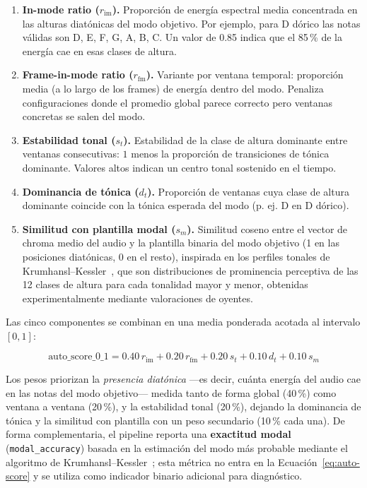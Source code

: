 \documentclass[%
    school=etsisi,%
    type=pfg,%
    degree=61CD,%
]{upm-report}
\begin{document}
\begin{enumerate}
    \item \textbf{In-mode ratio ($r_\text{im}$).} Proporci\'on de energ\'ia espectral media concentrada en las alturas diat\'onicas del modo objetivo. Por ejemplo, para D d\'orico las notas v\'alidas son D, E, F, G, A, B, C. Un valor de 0.85 indica que el 85\,\% de la energ\'ia cae en esas clases de altura.

    \item \textbf{Frame-in-mode ratio ($r_\text{fm}$).} Variante por ventana temporal: proporci\'on media (a lo largo de los frames) de energ\'ia dentro del modo. Penaliza configuraciones donde el promedio global parece correcto pero ventanas concretas se salen del modo.

    \item \textbf{Estabilidad tonal ($s_t$).} Estabilidad de la clase de altura dominante entre ventanas consecutivas: $1$ menos la proporci\'on de transiciones de t\'onica dominante. Valores altos indican un centro tonal sostenido en el tiempo.

    \item \textbf{Dominancia de t\'onica ($d_t$).} Proporci\'on de ventanas cuya clase de altura dominante coincide con la t\'onica esperada del modo (p. ej. D en D d\'orico).

    \item \textbf{Similitud con plantilla modal ($s_m$).} Similitud coseno entre el vector de chroma medio del audio y la plantilla binaria del modo objetivo (1 en las posiciones diat\'onicas, 0 en el resto), inspirada en los perfiles tonales de Krumhansl--Kessler~\cite{krumhansl1982}, que son distribuciones de prominencia perceptiva de las 12 clases de altura para cada tonalidad mayor y menor, obtenidas experimentalmente mediante valoraciones de oyentes.
\end{enumerate}

Las cinco componentes se combinan en una media ponderada acotada al intervalo $[0,1]$:

\begin{equation}
    \text{auto\_score\_0\_1} = 0.40\,r_\text{im} + 0.20\,r_\text{fm} + 0.20\,s_t + 0.10\,d_t + 0.10\,s_m
    \label{eq:auto-score}
\end{equation}

Los pesos priorizan la \emph{presencia diat\'onica} ---es decir, cu\'anta energ\'ia del audio cae en las notas del modo objetivo--- medida tanto de forma global (40\,\%) como ventana a ventana (20\,\%), y la estabilidad tonal (20\,\%), dejando la dominancia de t\'onica y la similitud con plantilla con un peso secundario (10\,\% cada una). De forma complementaria, el pipeline reporta una \textbf{exactitud modal} (\texttt{modal\_accuracy}) basada en la estimaci\'on del modo m\'as probable mediante el algoritmo de Krumhansl--Kessler~\cite{krumhansl1982}; esta m\'etrica no entra en la Ecuaci\'on~\ref{eq:auto-score} y se utiliza como indicador binario adicional para diagn\'ostico.
\end{document}
